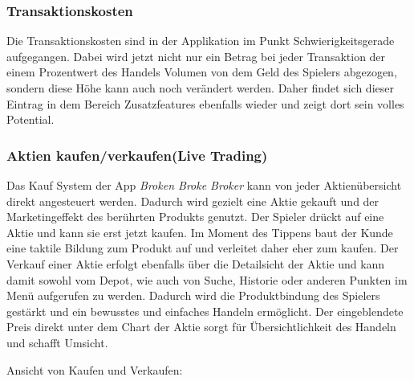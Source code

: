 \documentclass[10pt]{scrartcl}
\begin{document}
\subsubsection{Transaktionskosten}

Die Transaktionskosten sind in der Applikation im Punkt Schwierigkeitsgerade aufgegangen. Dabei wird jetzt nicht nur ein Betrag bei jeder Transaktion der einem Prozentwert des Handels Volumen von dem Geld des Spielers abgezogen, sondern diese Höhe kann auch noch verändert werden. Daher findet sich dieser Eintrag in dem Bereich Zusatzfeatures ebenfalls wieder und zeigt dort sein volles Potential.

\subsubsection{Aktien kaufen/verkaufen(Live Trading)}

Das Kauf System der App \textit{Broken Broke Broker} kann von jeder Aktienübersicht direkt angesteuert werden. Dadurch wird gezielt eine Aktie gekauft und der Marketingeffekt des berührten Produkts genutzt. Der Spieler drückt auf eine Aktie und kann sie erst jetzt kaufen. Im Moment des Tippens baut der Kunde eine taktile Bildung zum Produkt auf und verleitet daher eher zum kaufen. Der Verkauf einer Aktie erfolgt ebenfalls über die Detailsicht der Aktie und kann damit sowohl vom Depot, wie auch von Suche, Historie oder anderen Punkten im Menü aufgerufen zu werden. Dadurch wird die Produktbindung des Spielers gestärkt und ein bewusstes und einfaches Handeln ermöglicht. Der eingeblendete Preis direkt unter dem Chart der Aktie sorgt für Übersichtlichkeit des Handeln und schafft Umsicht.

Ansicht von Kaufen und Verkaufen:
\end{document}
